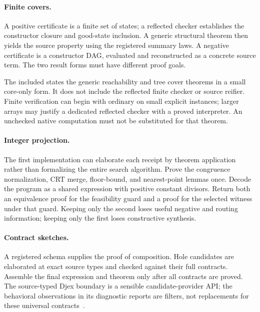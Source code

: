 \paragraph{Finite covers.}
A positive certificate is a finite set of states; a reflected checker establishes
the constructor closure and good-state inclusion. A generic structural theorem
then yields the source property using the registered summary laws. A negative
certificate is a constructor DAG, evaluated and reconstructed as a concrete
source term. The two result forms must have different proof goals.

The included  states the generic reachability and tree
cover theorems in a small core-only form. It does not include the reflected
finite checker or source reifier. Finite verification can begin with ordinary
 on small explicit instances; larger arrays may justify a dedicated
reflected checker with a proved interpreter. An unchecked native computation
must not be substituted for that theorem.

\paragraph{Integer projection.}
The first implementation can elaborate each receipt by theorem application rather
than formalizing the entire search algorithm. Prove the congruence normalization,
CRT merge, floor-bound, and nearest-point lemmas once. Decode the program as a
shared expression with positive constant divisors. Return both an equivalence
proof for the feasibility guard and a proof for the selected witness under that
guard. Keeping only the second loses useful negative and routing information;
keeping only the first loses constructive synthesis.

\paragraph{Contract sketches.}
A registered schema supplies the proof of composition. Hole candidates are
elaborated at exact source types and checked against their full contracts.
Assemble the final expression and theorem only after all contracts are proved.
The source-typed Djex boundary is a sensible candidate-provider API; the
behavioral observations in its diagnostic reports are filters, not replacements
for these universal contracts~\cite{djex-readme,leant-readme}.

